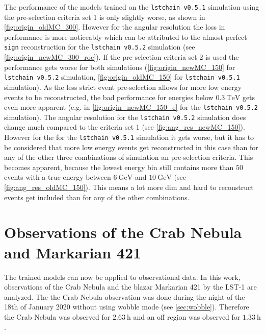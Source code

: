 The performance of the models trained on the \texttt{lstchain v0.5.1} simulation using the pre-selection criteria set 1 is only slightly worse, 
as shown in \autoref{fig:origin_oldMC_300}.
However for the angular resolution the loss in performance is more noticeably which can be attributed to the almost perfect \texttt{sign}
reconstruction for the \texttt{lstchain v0.5.2} simulation (see \autoref{fig:origin_newMC_300_roc}).
If the pre-selection criteria set 2 is used the performance gets worse for both simulations 
(\autoref{fig:origin_newMC_150} for \texttt{lstchain v0.5.2} simulation, \autoref{fig:origin_oldMC_150} for \texttt{lstchain v0.5.1} simulation).
As the less strict event pre-selection allows for more low energy events to be reconstructed, the bad performance for energies below $\SI{0.3}{\tera\electronvolt}$
gets even more apparent (e.g. in \autoref{fig:origin_newMC_150_e} for the \texttt{lstchain v0.5.2} simulation).
The angular resolution for the \texttt{lstchain v0.5.2} simulation does change much compared to the criteria set 1 (see \autoref{fig:ang_res_newMC_150}).
However for the for the \texttt{lstchain v0.5.1} simulation it gets worse, but it has to be considered that more low energy events get reconstructed 
in this case than for any of the other three combinations of simulation an pre-selection criteria.
This becomes apparent, because the lowest energy bin still contains more than $\num{50}$ events with a true energy between $\SI{6}{\giga\electronvolt}$
and $\SI{10}{\giga\electronvolt}$ (see \autoref{fig:ang_res_oldMC_150}).
This means a lot more dim and hard to reconstruct events get included than for any of the other combinations.


\section{Observations of the Crab Nebula and Markarian 421}
The trained models can now be applied to observational data.
In this work, observations of the Crab Nebula and the blazar Markarian 421 by the LST-1 are analyzed.
The the Crab Nebula observation was done during the night of the 18th of January 2020 without using wobble mode (see \autoref{sec:wobble}).
Therefore the Crab Nebula was observed for $\SI{2.63}{\hour}$ and an off region was observed for $\SI{1.33}{\hour}$.

